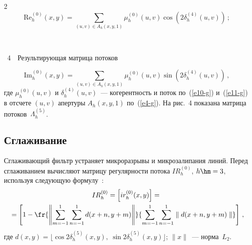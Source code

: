 \begin{multicols}{2}
\noindent
\begin{equation*}
\mathrm{Re}_h^{(0)}(x,y) = \!\!\!\!\sum\limits_{(u,v)\in A_h(x,y,1)}\!\!\!\!\mu_h^{(0)}(u,v)\cos\left( 
2\delta_h^{(4)}(u,v)\right)\,;
\end{equation*}


\begin{center} %
\vspace*{12pt}
\mbox{%
 \epsfxsize=79mm
}
\end{center}
\begin{center}
{{\figurename~4}\ \ \small{Результирующая матрица потоков}}
\end{center}
\vspace*{9pt}

\addtocounter{figure}{1}


\noindent
\begin{equation*}
\mathrm{Im}_h^{(0)}(x,y) = \!\!\!\!\sum\limits_{(u,v)\in A_h(x,y,1)}\!\!\!\! \mu_h^{(0)}(u,v)\sin\left( 
2\delta_h^{(4)}(u,v)\right)\,,
  \end{equation*}
где $\mu_h^{(0)}(u,v)$ и $\delta_h^{(4)}(u,v)$~--- когерентность и поток 
по~(\ref{e10-g}) и~(\ref{e11-g}) в отсчете $(u,v)$ апертуры $A_h(x,y,1)$ 
по~(\ref{e4-g}). На рис.~4 показана матрица потоков~$\Lambda_h^{(5)}$.



\subsection{Сглаживание} %

  Сглаживающий фильтр устраняет микроразрывы и микрозалипания линий. 
Перед сглаживанием вычисляют матрицу регулярности потока $IR_h^{(0)}$, 
$h\hm=3$, используя следующую формулу~\cite{1-g}:
  \begin{multline*}
  IR_h^{(0)} =\left[ ir_h^{(0)}(x,y)\right] ={}\\
  {}=\left[ 1-\fr{\left \Vert 
  \sum\limits_{m=-1}^1 \sum\limits_{n=-1}^1 d(x+n,y+m)\right\Vert}{\sum\limits_{m=-1}^1 
\sum\limits_{n=-1}^1 \parallel d(x+n,y+m)\parallel}\right]\,,
  \end{multline*}
где $d(x,y)=\lfloor \cos 2\delta_h^{(5)}(x,y),\;\sin2\delta_h^{(5)}(x,y)\rfloor$; 
$\parallel x\parallel$~--- норма~$L_2$.
  

\end{multicols}

